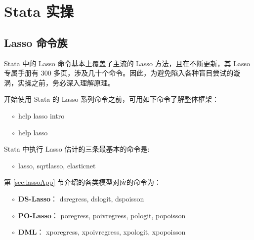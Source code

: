 {      %

















\section{Stata 实操}

\subsection{Lasso 命令族}
Stata 中的 Lasso 命令基本上覆盖了主流的 Lasso 方法，且在不断更新，其 Lasso 专属手册有 300 多页，涉及几十个命令。因此，为避免陷入各种盲目尝试的漩涡，实操之前，务必深入理解原理。

开始使用 Stata 的 Lasso 系列命令之前，可用如下命令了解整体框架：



$\quad \circ$ 
         help lasso intro
         
$\quad \circ$ 
         help lasso

 


%
Stata 中执行 Lasso 估计的三条最基本的命令是:


$\quad \circ$  
lasso, 
sqrtlasso, 
elasticnet


第 \ref{sec:lassoApp} 节介绍的各类模型对应的命令为：


$\quad \circ$  
\textbf{DS-Lasso}：
   dsregress, 
   dslogit, 
   dspoisson

$\quad \circ$ 
\textbf{PO-Lasso}：
   poregress, 
   poivregress, 
   pologit, 
   popoisson

$\quad \circ$ 
\textbf{DML}：
   xporegress, 
   xpoivregress, 
   xpologit, 
   xpopoisson


}
